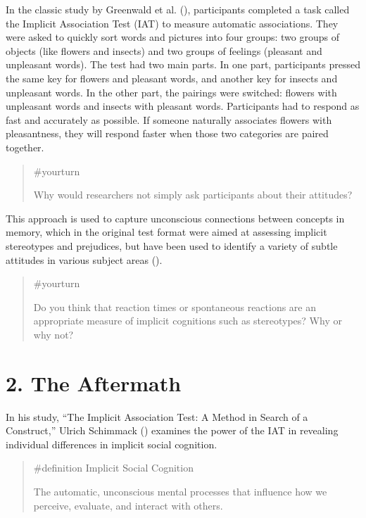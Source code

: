 \documentclass[
  letterpaper,
]{book}
\begin{document}
In the classic study by Greenwald et al.
(), participants completed a
task called the Implicit Association Test (IAT) to measure automatic
associations. They were asked to quickly sort words and pictures into
four groups: two groups of objects (like flowers and insects) and two
groups of feelings (pleasant and unpleasant words). The test had two
main parts. In one part, participants pressed the same key for flowers
and pleasant words, and another key for insects and unpleasant words. In
the other part, the pairings were switched: flowers with unpleasant
words and insects with pleasant words. Participants had to respond as
fast and accurately as possible. If someone naturally associates flowers
with pleasantness, they will respond faster when those two categories
are paired together.

\begin{quote}
{\#yourturn}

Why would researchers not simply ask participants about their attitudes?
\end{quote}

This approach is used to capture unconscious connections between
concepts in memory, which in the original test format were aimed at
assessing implicit stereotypes and prejudices, but have been used to
identify a variety of subtle attitudes in various subject areas
().

\begin{quote}
{\#yourturn}

Do you think that reaction times or spontaneous reactions are an
appropriate measure of implicit cognitions such as stereotypes? Why or
why not?
\end{quote}

\section{2. The Aftermath}\label{the-aftermath-2}

In his study, ``The Implicit Association Test: A Method in Search of a
Construct,'' Ulrich Schimmack ()
examines the power of the IAT in revealing individual differences in
implicit social cognition.

\begin{quote}
\label{def-implicitsocialcognition}{\#definition}
Implicit Social Cognition

The automatic, unconscious mental processes that influence how we
perceive, evaluate, and interact with others.
\end{quote}
\end{document}
